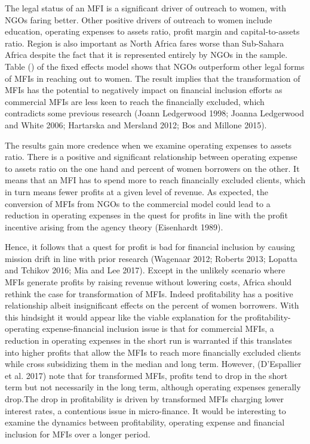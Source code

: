 \documentclass[
]{article}
\begin{document}
The legal status of an MFI is a significant driver of outreach to women,
with NGOs faring better. Other positive drivers of outreach to women
include education, operating expenses to assets ratio, profit margin and
capital-to-assets ratio. Region is also important as North Africa fares
worse than Sub-Sahara Africa despite the fact that it is represented
entirely by NGOs in the sample. Table () of the fixed effects model
shows that NGOs outperform other legal forms of MFIs in reaching out to
women. The result implies that the transformation of MFIs has the
potential to negatively impact on financial inclusion efforts as
commercial MFIs are less keen to reach the financially excluded, which
contradicts some previous research (Joann Ledgerwood 1998; Joanna
Ledgerwood and White 2006; Hartarska and Mersland 2012; Bos and Millone
2015).

The results gain more credence when we examine operating expenses to
assets ratio. There is a positive and significant relationship between
operating expense to assets ratio on the one hand and percent of women
borrowers on the other. It means that an MFI has to spend more to reach
financially excluded clients, which in turn means fewer profits at a
given level of revenue. As expected, the conversion of MFIs from NGOs to
the commercial model could lead to a reduction in operating expenses in
the quest for profits in line with the profit incentive arising from the
agency theory (Eisenhardt 1989).

Hence, it follows that a quest for profit is bad for financial inclusion
by causing mission drift in line with prior research (Wagenaar 2012;
Roberts 2013; Lopatta and Tchikov 2016; Mia and Lee 2017). Except in the
unlikely scenario where MFIs generate profits by raising revenue without
lowering costs, Africa should rethink the case for transformation of
MFIs. Indeed profitability has a positive relationship albeit
insignificant effects on the percent of women borrowers. With this
hindsight it would appear like the viable explanation for the
profitability-operating expense-financial inclusion issue is that for
commercial MFIs, a reduction in operating expenses in the short run is
warranted if this translates into higher profits that allow the MFIs to
reach more financially excluded clients while cross subsidizing them in
the median and long term. However, (D'Espallier et al. 2017) note that
for transformed MFIs, profits tend to drop in the short term but not
necessarily in the long term, although operating expenses generally
drop.The drop in profitability is driven by transformed MFIs charging
lower interest rates, a contentious issue in micro-finance. It would be
interesting to examine the dynamics between profitability, operating
expense and financial inclusion for MFIs over a longer period.
\end{document}
